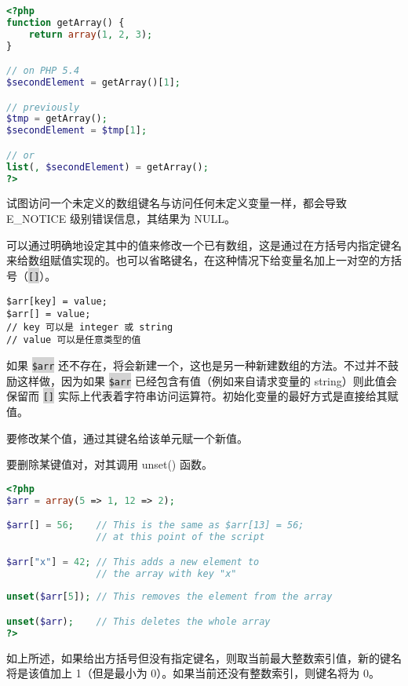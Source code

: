 \begin{lstlisting}[language=PHP]
<?php
function getArray() {
    return array(1, 2, 3);
}

// on PHP 5.4
$secondElement = getArray()[1];

// previously
$tmp = getArray();
$secondElement = $tmp[1];

// or
list(, $secondElement) = getArray();
?>
\end{lstlisting}

试图访问一个未定义的数组键名与访问任何未定义变量一样，都会导致 E\_NOTICE 级别错误信息，其结果为 NULL。

可以通过明确地设定其中的值来修改一个已有数组，这是通过在方括号内指定键名来给数组赋值实现的。也可以省略键名，在这种情况下给变量名加上一对空的方括号（\colorbox{lightgray}{\texttt{[]}}）。

\begin{verbatim}
$arr[key] = value;
$arr[] = value;
// key 可以是 integer 或 string
// value 可以是任意类型的值
\end{verbatim}

如果 \colorbox{lightgray}{\texttt{\$arr}} 还不存在，将会新建一个，这也是另一种新建数组的方法。不过并不鼓励这样做，因为如果 \colorbox{lightgray}{\texttt{\$arr}} 已经包含有值（例如来自请求变量的 string）则此值会保留而 \colorbox{lightgray}{\texttt{[]}} 实际上代表着字符串访问运算符。初始化变量的最好方式是直接给其赋值。


\begin{compactitem}
\item 要修改某个值，通过其键名给该单元赋一个新值。
\item 要删除某键值对，对其调用 unset() 函数。
\end{compactitem}



\begin{lstlisting}[language=PHP]
<?php
$arr = array(5 => 1, 12 => 2);

$arr[] = 56;    // This is the same as $arr[13] = 56;
                // at this point of the script

$arr["x"] = 42; // This adds a new element to
                // the array with key "x"
                
unset($arr[5]); // This removes the element from the array

unset($arr);    // This deletes the whole array
?>
\end{lstlisting}

如上所述，如果给出方括号但没有指定键名，则取当前最大整数索引值，新的键名将是该值加上 1（但是最小为 0）。如果当前还没有整数索引，则键名将为 0。


